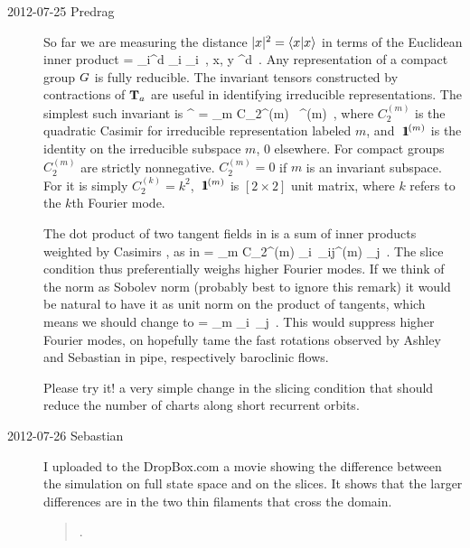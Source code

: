 \begin{description}
\item[2012-07-25 Predrag]
So far we are measuring the distance $|\ssp|^2=\braket{\ssp}{\ssp}$ in
terms of the Euclidean inner product
\beq
\braket{\ssp}{\slicep} = \sum_i^d {\ssp}_i \slicep_i
    \,,\; \qquad
x, y \in \pS \subset \reals^d
	\,.
Any representation of a compact group $G$ is fully
reducible. The invariant tensors constructed by contractions
of $\mathbf{T}_a$ are useful in identifying irreducible representations. The
simplest such invariant is
\beq
{\Lg}^{\dagger} \cdot \Lg = \sum_m C_2^{(m)} \, \id^{(m)}
\,,
where $C_2^{(m)}$ is the quadratic Casimir for irreducible representation
labeled $m$, and ${\ \hbox{{\rm 1}\kern-.6em\hbox{\rm 1}}}^{(m)}$ is the identity on the irreducible subspace
$m$, 0 elsewhere. For compact groups $C_2^{(m)}$ are strictly
nonnegative. $C_2^{(m)} =0$ if $m$ is an invariant subspace. For 
it is simply $C_2^{(k)} =k^2$, ${\ \hbox{{\rm 1}\kern-.6em\hbox{\rm 1}}}^{(m)}$ is $[2\!\times\! 2]$ unit matrix,
where $k$ refers to the $k$th Fourier
mode.

The dot product of two tangent fields in  is a sum of inner
products weighted by Casimirs , as in 
\beq
\braket{\groupTan(\ssp)}{\groupTan(\slicep)}
   = \sum_m C_2^{(m)} {\ssp}_i\, \delta_{ij}^{(m)} \slicep_j
\,.
The slice condition thus preferentially weighs higher Fourier modes. If
we think of the norm as Sobolev norm (probably best to ignore this
remark) it would be natural to have it as unit norm on the product of
tangents, which  means we should change  to
\beq
\braket{\ssp}{\slicep}
   = \sum_m {\ssp}_i\,  \slicep_j
\,.
This would suppress higher Fourier modes, on hopefully tame the fast
rotations observed by Ashley and Sebastian in pipe, respectively
baroclinic  flows.

{\color{red} Please try it!} a very simple change in the slicing condition that
should reduce the number of charts along short recurrent orbits.

\item[2012-07-26 Sebastian] I uploaded to the DropBox.com a movie showing
the difference between the simulation on full state space and on the
slices. It shows that the larger differences are in the two thin
filaments that cross the domain.

\begin{quote}
.
\end{quote}


\end{description}
